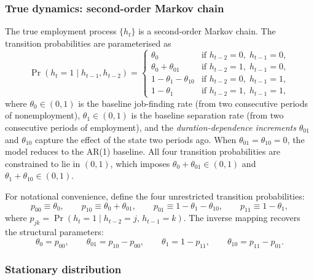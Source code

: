 \subsubsection{True dynamics: second-order Markov chain}
\label{sec:ar2_dynamics}

The true employment process $\{h_t\}$ is a second-order Markov chain.
The transition probabilities are parameterised as
\begin{equation}
\Pr(h_t = 1 \mid h_{t-1}, h_{t-2}) =
\begin{cases}
\theta_0                          & \text{if } h_{t-2} = 0,\; h_{t-1} = 0, \\
\theta_0 + \theta_{01}            & \text{if } h_{t-2} = 1,\; h_{t-1} = 0, \\
1 - \theta_1 - \theta_{10}        & \text{if } h_{t-2} = 0,\; h_{t-1} = 1, \\
1 - \theta_1                      & \text{if } h_{t-2} = 1,\; h_{t-1} = 1,
\end{cases}
\label{eq:ar2_transitions}
\end{equation}
where $\theta_0 \in (0,1)$ is the baseline job-finding rate (from
two consecutive periods of nonemployment), $\theta_1 \in (0,1)$ is the
baseline separation rate (from two consecutive periods of employment),
and the \emph{duration-dependence increments} $\theta_{01}$ and
$\theta_{10}$ capture the effect of the state two periods ago. When
$\theta_{01} = \theta_{10} = 0$, the model reduces to the AR(1)
baseline. All four transition probabilities are constrained to lie in
$(0,1)$, which imposes $\theta_0 + \theta_{01} \in (0,1)$ and
$\theta_1 + \theta_{10} \in (0,1)$.

For notational convenience, define the four unrestricted transition
probabilities:
\begin{equation}
p_{00} \equiv \theta_0, \qquad
p_{10} \equiv \theta_0 + \theta_{01}, \qquad
p_{01} \equiv 1 - \theta_1 - \theta_{10}, \qquad
p_{11} \equiv 1 - \theta_1,
\label{eq:p_from_theta}
\end{equation}
where $p_{jk} = \Pr(h_t = 1 \mid h_{t-2} = j,\, h_{t-1} = k)$. The
inverse mapping recovers the structural parameters:
\begin{equation}
\theta_0 = p_{00}, \qquad
\theta_{01} = p_{10} - p_{00}, \qquad
\theta_1 = 1 - p_{11}, \qquad
\theta_{10} = p_{11} - p_{01}.
\label{eq:theta_from_p}
\end{equation}

\subsubsection{Stationary distribution}
\label{sec:stationary}


